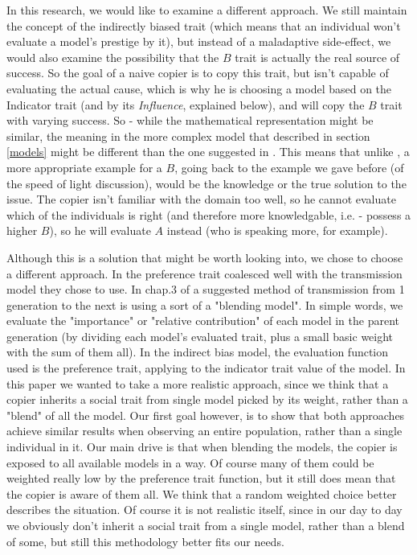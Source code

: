 \documentclass[11pt]{article}
\begin{document}
\begin{itemize}
  In this research, we would like to examine a different approach. We still maintain the concept of the indirectly biased trait (which means that an individual won't evaluate a model's prestige by it), but instead of a maladaptive side-effect, we would also examine the possibility that the $B$ trait is actually the real source of success. So the goal of a naive copier is to copy this trait, but isn't capable of evaluating the actual cause, which is why he is choosing a model based on the Indicator trait (and by its \textit{Influence}, explained below), and will copy the $B$ trait with varying success.
  So - while the mathematical representation might be similar, the meaning in the more complex model that described in section \ref{models} might be different than the one suggested in \cite{evolutionBook}.
  This means that unlike \cite{evolutionBook}, a more appropriate example for a $B$, going back to the example we gave before (of the speed of light discussion), would be the knowledge or the true solution to the issue. The copier isn't familiar with the domain too well, so he cannot evaluate which of the individuals is right (and therefore more knowledgable, i.e. - possess a higher $B$), so he will evaluate $A$ instead (who is speaking more, for example).
  \end{itemize}
    
  Although this is a solution that might be worth looking into, we chose to choose a different approach. In \cite{evolutionBook} the preference trait coalesced well with the transmission model they chose to use. In chap.3 of \cite{evolutionBook} a suggested method of transmission from 1 generation to the next is using a sort of a "blending model". In simple words, we evaluate the "importance" or "relative contribution" of each model in the parent generation (by dividing each model's evaluated trait, plus a small basic weight with the sum of them all). In the indirect bias model, the evaluation function used is the preference trait, applying to the indicator trait value of the model.
  In this paper we wanted to take a more realistic approach, since we think that a copier inherits a social trait from single model picked by its weight, rather than a "blend" of all the model. Our first goal however, is to show that both approaches achieve similar results when observing an entire population, rather than a single individual in it. Our main drive is that when blending the models, the copier is exposed to all available models in a way. Of course many of them could be weighted really low by the preference trait function, but it still does mean that the copier is aware of them all. We think that a random weighted choice better describes the situation. Of course it is not realistic itself, since in our day to day we obviously don't inherit a social trait from a single model, rather than a blend of some, but still this methodology better fits our needs.
  
\end{document}
